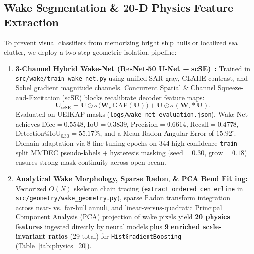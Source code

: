 \documentclass[11pt,a4paper]{article}
\begin{document}
\subsection{Wake Segmentation \& 20-D Physics Feature Extraction}
To prevent visual classifiers from memorizing bright ship hulls or localized sea clutter, we deploy a two-step geometric isolation pipeline:
\begin{enumerate}[leftmargin=1.5em]
    \item \textbf{3-Channel Hybrid Wake-Net (ResNet-50 U-Net + scSE)~\cite{zhang2023wakenet}:} Trained in \texttt{src/wake/train\_wake\_net.py} using unified SAR gray, CLAHE contrast, and Sobel gradient magnitude channels. Concurrent Spatial \& Channel Squeeze-and-Excitation (scSE) blocks recalibrate decoder feature maps:
    \begin{equation}
    \mathbf{U}_{\text{scSE}} = \mathbf{U}\odot\sigma\big(\mathbf{W}_c\,\text{GAP}(\mathbf{U})\big) + \mathbf{U}\odot\sigma(\mathbf{W}_s * \mathbf{U}).
    \end{equation}
    Evaluated on UEIKAP masks (\texttt{logs/wake\_net\_evaluation.json}), Wake-Net achieves $\text{Dice}=0.5548$, $\text{IoU}=0.3839$, $\text{Precision}=0.6614$, $\text{Recall}=0.4778$, $\text{Detection@IoU}_{0.30}=55.17\%$, and a Mean Radon Angular Error of $15.92^\circ$. Domain adaptation via 8 fine-tuning epochs on 344 high-confidence \texttt{train}-split MMDEC pseudo-labels + hysteresis masking ($\text{seed}=0.30$, $\text{grow}=0.18$) ensures strong mask continuity across open ocean.
    \item \textbf{Analytical Wake Morphology, Sparse Radon, \& PCA Bend Fitting:} Vectorized $O(N)$ skeleton chain tracing (\texttt{extract\_ordered\_centerline} in \texttt{src/geometry/wake\_geometry.py}), sparse Radon transform integration across near- vs.\ far-hull annuli, and linear-versus-quadratic Principal Component Analysis (PCA) projection of wake pixels yield \textbf{20 physics features} ingested directly by neural models plus \textbf{9 enriched scale-invariant ratios} (29 total) for \texttt{HistGradientBoosting} (Table~\ref{tab:physics_20}).
\end{enumerate}
\end{document}
